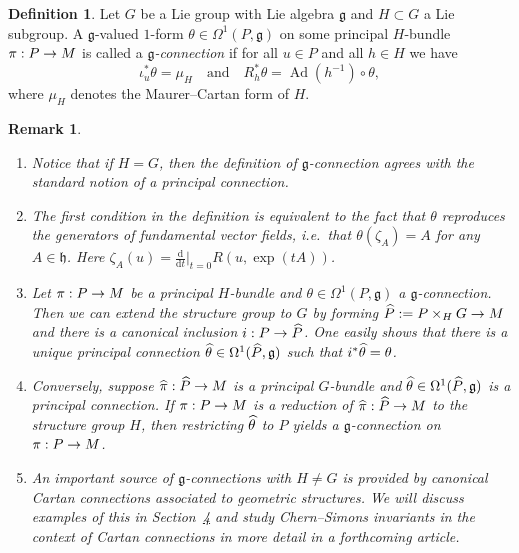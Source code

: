 \documentclass[10pt,a4paper]{amsart}
\newcommand{\x}{\times}
\DeclareMathOperator{\Ad}{Ad}
\renewcommand*{\d}{\mathrm{d}}
\newcommand{\fkg}{\mathfrak{g}}
\newcommand{\fkh}{\mathfrak{h}}
\renewcommand*{\to}{\mathchoice{\longrightarrow}{\rightarrow}{\rightarrow}{\rightarrow}}
\newcommand*{\relabel}{\renewcommand{\labelenumi}{(\theenumi)}}
\newcommand*{\romanenumi}{\renewcommand*{\theenumi}{\roman{enumi}}\relabel}
\let\oldhat\hat
\renewcommand*{\hat}[1]{\mathchoice{\widehat{#1}}{\widehat{#1}}{\oldhat{#1}}{\oldhat{#1}}}
\newtheorem{rema}[theo]{Remark}
\theoremstyle{definition}\newtheorem{defi}[theo]{Definition}
\begin{document}
\begin{defi}\label{defn:gconnection}
Let $G$ be a Lie group with Lie algebra $\fkg$ and $H\subset G$ a Lie subgroup. A $\fkg$-valued $1$-form $\theta \in \Omega^1(P,\fkg)$ on some principal $H$-bundle $\pi : P \to M$ is called a
\emph{$\fkg$-connection} if for all $u\in P$ and all $h \in H$ we have
\begin{equation}\label{eqn:gvalued1form}
\iota_u^*\theta=\mu_H \quad \text{and} \quad R_h^*\theta=\Ad(h^{-1})\circ \theta,
\end{equation}
where $\mu_H$ denotes the Maurer--Cartan form of $H$.
\end{defi}

\begin{rema}
\leavevmode
\begin{enumerate}\romanenumi
\item\label{rema3.2.1} Notice that if $H=G$, then the definition of $\fkg$-connection agrees with the standard notion of a principal connection.

\item\label{rema3.2.2} The first condition in the definition is equivalent to the fact that $\theta$ reproduces the generators of fundamental vector fields, i.e.\ that $\theta(\zeta_A)=A$ for any $A\in\fkh$. Here $\zeta_A(u)=\frac{\d}{\d t}|_{t=0}R(u,\exp(tA))$.

\item\label{rema3.2.3} Let $\pi: P\to M$ be a principal $H$-bundle and $\theta\in\Omega^1(P,\fkg)$ a $\fkg$-connection. Then we can extend the structure group to $G$ by forming $\hat{P}:=P\x_H G\to M$ and there is a canonical inclusion $i: P\to \hat{P}$. One easily shows that there is a unique principal connection $\hat{\theta}\in\Omega^1(\hat{P},\fkg)$ such that $i^*\hat{\theta}=\theta$.

\item\label{rema3.2.4} Conversely, suppose $\hat{\pi} : \hat{P} \to M$ is a principal $G$-bundle and $\hat{\theta} \in \Omega^1(\hat{P},\fkg)$ is a principal connection. If $\pi : P \to M$ is a reduction of $\hat{\pi} : \hat{P} \to M$ to the structure group $H$, then restricting $\hat{\theta}$ to $P$ yields a $\fkg$-connection on $\pi : P \to M$.

\item\label{rema3.2.5} An important source of $\fkg$-connections with $H\neq G$ is provided by canonical Cartan connections associated to geometric structures. We will discuss examples of this in Section~\href{https://ahl.centre-mersenne.org/item/AHL_2025__8__1037_0/}{4} and study Chern--Simons invariants in the context of Cartan connections in more detail in a forthcoming article.
\end{enumerate}
\end{rema}
\end{document}
